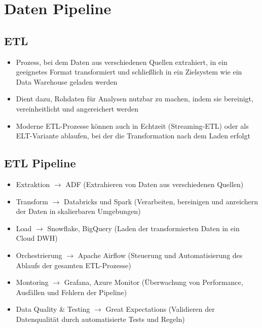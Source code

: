 \documentclass[11pt]{scrartcl}
\begin{document}
\newpage
\section{Daten Pipeline}
\subsection{ETL}
\begin{itemize}
	\item Prozess, bei dem Daten aus verschiedenen Quellen extrahiert, in ein geeignetes Format transformiert und schließlich in ein Zielsystem wie ein Data Warehouse geladen werden
	\item Dient dazu, Rohdaten für Analysen nutzbar zu machen, indem sie bereinigt, vereinheitlicht und angereichert werden
	\item Moderne ETL-Prozesse können auch in Echtzeit (Streaming-ETL) oder als ELT-Variante ablaufen, bei der die Transformation nach dem Laden erfolgt
\end{itemize}


\subsection{ETL Pipeline}
\begin{itemize}
	\item Extraktion $ \to $ ADF (Extrahieren von Daten aus verschiedenen Quellen)
	\item Transform $ \to $ Databricks und Spark (Verarbeiten, bereinigen und anreichern der Daten in skalierbaren Umgebungen)
	\item Load $ \to $ Snowflake, BigQuery (Laden der transformierten Daten in ein Cloud DWH)
	\item Orchestrierung $ \to $ Apache Airflow (Steuerung und Automatisierung des Ablaufs der gesamten ETL-Prozesse)
	\item Montoring $ \to $ Grafana, Azure Monitor (Überwachung von Performance, Ausfällen und Fehlern der Pipeline)
	\item Data Quality \& Testing $ \to $ Great Expectations (Validieren der Datenqualität durch automatisierte Tests und Regeln)
\end{itemize}
\end{document}
